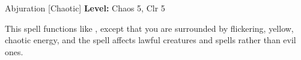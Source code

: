 {Abjuration [Chaotic]}
{
	\textbf{Level:}
	Chaos 5, Clr 5\\
}
{
	This spell functions like , except that you are surrounded by flickering, yellow, chaotic energy, and the spell affects lawful creatures and spells rather than evil ones.

}
